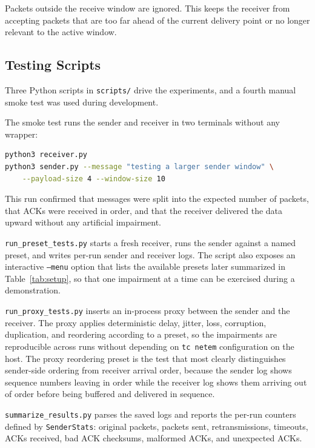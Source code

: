 \documentclass[conference]{IEEEtran}
\begin{document}
Packets outside the receive window are ignored. This keeps the receiver from
accepting packets that are too far ahead of the current delivery point or no
longer relevant to the active window.

\subsection{Testing Scripts}
Three Python scripts in \texttt{scripts/} drive the experiments, and a fourth
manual smoke test was used during development.

The smoke test runs the sender and receiver in two terminals without any
wrapper:

\begin{lstlisting}[language=bash]
python3 receiver.py
python3 sender.py --message "testing a larger sender window" \
    --payload-size 4 --window-size 10
\end{lstlisting}

This run confirmed that messages were split into the expected number of
packets, that ACKs were received in order, and that the receiver delivered
the data upward without any artificial impairment.

\texttt{run\_preset\_tests.py} starts a fresh receiver, runs the sender
against a named preset, and writes per-run sender and receiver logs. The
script also exposes an interactive \texttt{--menu} option that lists the
available presets later summarized in Table~\ref{tab:setup}, so that one
impairment at a time can be exercised during a demonstration.

\texttt{run\_proxy\_tests.py} inserts an in-process proxy between the sender
and the receiver. The proxy applies deterministic delay, jitter, loss,
corruption, duplication, and reordering according to a preset, so the
impairments are reproducible across runs without depending on
\texttt{tc netem} configuration on the host. The proxy reordering preset is
the test that most clearly distinguishes sender-side ordering from receiver
arrival order, because the sender log shows sequence numbers leaving in
order while the receiver log shows them arriving out of order before being
buffered and delivered in sequence.

\texttt{summarize\_results.py} parses the saved logs and reports the per-run
counters defined by \texttt{SenderStats}: original packets, packets sent,
retransmissions, timeouts, ACKs received, bad ACK checksums, malformed ACKs,
and unexpected ACKs.
\end{document}
